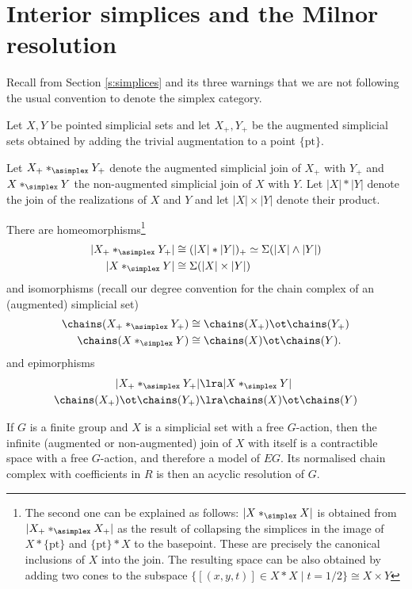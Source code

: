 
\section{Interior simplices and the Milnor resolution}\label{s:milnor}
\begin{warning}
Recall from Section \cref{s:simplices} and its three warnings that we are not following the usual convention to denote the simplex category.
\end{warning}
Let $X, Y$ be pointed simplicial sets and let $X_+, Y_+$ be the augmented simplicial sets obtained by adding the trivial augmentation to a point $\{\mathrm{pt}\}$.

Let $X_+*_{\asimplex}Y_+$ denote the augmented simplicial join of $X_+$ with $Y_+$ and $X *_{\simplex} Y$ the non-augmented simplicial join of $X$ with $Y$. Let $|X|*|Y|$ denote the join of the realizations of $X$ and $Y$ and let $|X|\times |Y|$ denote their product. 

There are homeomorphisms\footnote{The second one can be explained as follows: $|X*_\simplex X|$ is obtained from $|X_+*_{\asimplex} X_+|$ as the result of collapsing the simplices in the image of $X*\{\mathrm{pt}\}$ and $\{\mathrm{pt}\}*X$ to the basepoint. These are precisely the canonical inclusions of $X$ into the join. The resulting space can be also obtained by adding two cones to the subspace $\{[(x,y,t)]\in X*X\mid t=1/2\}\cong X\times Y$}
\begin{align*}
	|X_+*_{\asimplex} Y_+| 
	& \cong 
	(|X| * |Y|)_+
	\simeq
	\Sigma(|X|\wedge |Y|)
	\\
	|X*_{\simplex} Y| & \cong \Sigma (|X|\times |Y|)
\end{align*}
and isomorphisms (recall our degree convention for the chain complex of an (augmented) simplicial set)
\begin{align} \label{eq:chains_join}
	\chains(X_+*_{\asimplex} Y_+) &\cong \chains(X_+)\ot \chains(Y_+)
	\\
	\chains(X*_{\simplex} Y) &\cong \chains(X)\ot \chains(Y).
\end{align}
and epimorphisms
\begin{align*}
	|X_+*_{\asimplex} Y_+| &\lra |X*_{\simplex} Y|
	\\
	\chains(X_+)\ot \chains(Y_+) & \lra
	\chains(X)\ot \chains(Y)	
\end{align*}

If $G$ is a finite group and $X$ is a simplicial set with a free $G$-action, then the infinite (augmented or non-augmented) join of $X$ with itself is a contractible space with a free $G$-action, and therefore a model of $EG$. Its normalised chain complex with coefficients in $R$ is then an acyclic resolution of $G$.

